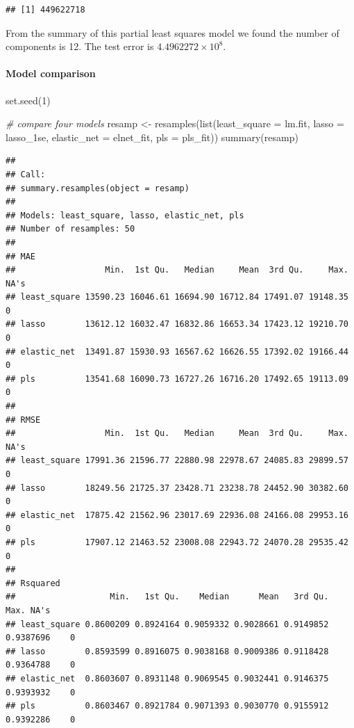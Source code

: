 \documentclass[
]{article}
\newenvironment{Shaded}{\begin{snugshade}}{\end{snugshade}}
\newcommand{\AttributeTok}[1]{\textcolor[rgb]{0.77,0.63,0.00}{#1}}
\newcommand{\CommentTok}[1]{\textcolor[rgb]{0.56,0.35,0.01}{\textit{#1}}}
\newcommand{\DecValTok}[1]{\textcolor[rgb]{0.00,0.00,0.81}{#1}}
\newcommand{\FunctionTok}[1]{\textcolor[rgb]{0.00,0.00,0.00}{#1}}
\newcommand{\NormalTok}[1]{#1}
\newcommand{\OtherTok}[1]{\textcolor[rgb]{0.56,0.35,0.01}{#1}}
\begin{document}
\begin{verbatim}
## [1] 449622718
\end{verbatim}

From the summary of this partial least squares model we found the number
of components is 12. The test error is
\ensuremath{4.4962272\times 10^{8}}.

\hypertarget{model-comparison}{%
\paragraph{Model comparison}\label{model-comparison}}

\begin{Shaded}
\begin{Highlighting}[]
\FunctionTok{set.seed}\NormalTok{(}\DecValTok{1}\NormalTok{)}

\CommentTok{\# compare four models}
\NormalTok{resamp }\OtherTok{\textless{}{-}} \FunctionTok{resamples}\NormalTok{(}\FunctionTok{list}\NormalTok{(}\AttributeTok{least\_square =}\NormalTok{ lm.fit, }\AttributeTok{lasso =}\NormalTok{ lasso\_1se, }\AttributeTok{elastic\_net =}\NormalTok{ elnet\_fit, }\AttributeTok{pls =}\NormalTok{ pls\_fit))}
\FunctionTok{summary}\NormalTok{(resamp)}
\end{Highlighting}
\end{Shaded}

\begin{verbatim}
## 
## Call:
## summary.resamples(object = resamp)
## 
## Models: least_square, lasso, elastic_net, pls 
## Number of resamples: 50 
## 
## MAE 
##                  Min.  1st Qu.   Median     Mean  3rd Qu.     Max. NA's
## least_square 13590.23 16046.61 16694.90 16712.84 17491.07 19148.35    0
## lasso        13612.12 16032.47 16832.86 16653.34 17423.12 19210.70    0
## elastic_net  13491.87 15930.93 16567.62 16626.55 17392.02 19166.44    0
## pls          13541.68 16090.73 16727.26 16716.20 17492.65 19113.09    0
## 
## RMSE 
##                  Min.  1st Qu.   Median     Mean  3rd Qu.     Max. NA's
## least_square 17991.36 21596.77 22880.98 22978.67 24085.83 29899.57    0
## lasso        18249.56 21725.37 23428.71 23238.78 24452.90 30382.60    0
## elastic_net  17875.42 21562.96 23017.69 22936.08 24166.08 29953.16    0
## pls          17907.12 21463.52 23008.08 22943.72 24070.28 29535.42    0
## 
## Rsquared 
##                   Min.   1st Qu.    Median      Mean   3rd Qu.      Max. NA's
## least_square 0.8600209 0.8924164 0.9059332 0.9028661 0.9149852 0.9387696    0
## lasso        0.8593599 0.8916075 0.9038168 0.9009386 0.9118428 0.9364788    0
## elastic_net  0.8603607 0.8931148 0.9069545 0.9032441 0.9146375 0.9393932    0
## pls          0.8603467 0.8921784 0.9071393 0.9030770 0.9155912 0.9392286    0
\end{verbatim}
\end{document}
